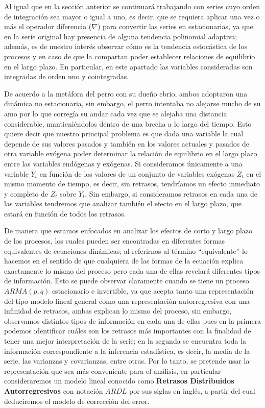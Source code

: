 Al igual que en la sección anterior se continuará trabajando con series cuyo orden de integración sea mayor o igual a uno, es decir, que se requiera aplicar una vez o más el operador diferencia ($\nabla$) para convertir las series en estacionarias, ya que en la serie original hay presencia de alguna tendencia polinomial adaptiva; además, es de nuestro interés  observar cómo es la tendencia estocástica de los procesos y en caso de que la compartan poder establecer relaciones de equilibrio en el largo plazo. En particular, en este apartado las variables consideradas son integradas de orden uno y cointegradas.  \bigskip


De acuerdo a la metáfora del perro con su due\~no ebrio, ambos adoptaron una dinámica no estacionaria, sin embargo, el perro intentaba no alejarse mucho de su amo por lo que corregía su andar cada vez que se alejaba una distancia considerable, mantieniéndolos dentro de una brecha a lo largo del tiempo.  Esto quiere decir que nuestro principal problema es que dada una variable la cual depende de sus valores pasados y también en los valores actuales y pasados de otra variable exógena poder determinar la relación de equilibrio en el largo plazo entre las variables endógenas y exógenas.  Si  consideramos únicamente a una variable $Y_t$ en función de los valores de un conjunto de variables exógenas $Z_t$ en el mismo momento de tiempo, es decir, sin retrasos, tendríamos un efecto inmediato y completo de $Z_t$ sobre $Y_t$. Sin embargo, si consideramos retrasos en cada una de las variables tendremos que analizar también el efecto en el largo plazo, que estará en función de todos los retrasos.\bigskip


De manera que estamos enfocados en analizar los efectos de corto y largo plazo de los procesos, los cuales pueden ser encontradas en diferentes formas equivalentes de ecuaciones dinámicas; al referirnos al término ``equivalente'' lo hacemos en el sentido de que cualquiera de las formas de la ecuación explica exactamente lo mismo del proceso pero cada una de ellas revelará diferentes tipos de información. Esto se puede observar claramente cuando se tiene un proceso $ARMA(p,q)$ estacionario e invertible, ya que acepta tanto una representación del tipo modelo lineal general como una representación autorregresiva con una infinidad de retrasos, ambas explican lo mismo del proceso, sin embargo, observamos distintos tipos de información en cada una de ellas pues en la primera podemos identificar cuáles son los retrasos más importantes con la finalidad de tener una mejor interpretación de la serie; en la segunda se encuentra toda la información correspondiente a la inferencia estadística, es decir, la media de la serie, las varianzas y covarianzas, entre otras. Por lo tanto, se pretende usar la representación que sea más conveniente para el análisis, en particular consideraremos un modelo lineal conocido como \textbf{Retrasos Distribuidos Autorregresivos} con notación $ARDL$ por sus siglas en inglés, a partir del cual deduciremos el modelo de corrección del error. \bigskip

